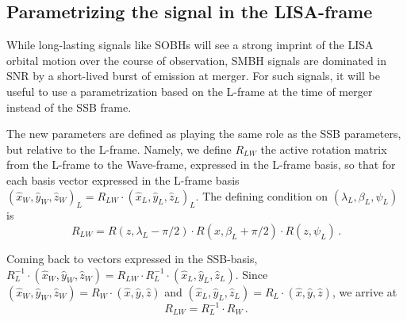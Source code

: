 \documentclass[aps,showpacs,twocolumn,prd,superscriptaddress,nofootinbib]{revtex4-1}
\newcommand{\be}{\begin{equation}}
\newcommand{\ee}{\end{equation}}
\begin{document}
\subsection{Parametrizing the signal in the LISA-frame}
\label{sec:LISAframeparams}

While long-lasting signals like SOBHs will see a strong imprint of the LISA orbital motion over the course of observation, SMBH signals are dominated in SNR by a short-lived burst of emission at merger. For such signals, it will be useful to use a parametrization based on the L-frame at the time of merger instead of the SSB frame.

The new parameters are defined as playing the same role as the SSB parameters, but relative to the L-frame. Namely, we define $R_{LW}$ the active rotation matrix from the L-frame to the Wave-frame, expressed in the L-frame basis, so that for each basis vector expressed in the L-frame basis $(\hat{x}_{W}, \hat{y}_{W}, \hat{z}_{W})_{L} = R_{LW} \cdot (\hat{x}_{L}, \hat{y}_{L}, \hat{z}_{L})_{L}$. The defining condition on $(\lambda_{L}, \beta_{L}, \psi_{L})$ is
\be\label{eq:defRLW}
	R_{LW} = R(z, \lambda_{L} - \pi/2) \cdot R(x, \beta_{L} + \pi/2 ) \cdot R(z, \psi_{L}) \,.
\ee

Coming back to vectors expressed in the SSB-basis, $R_{L}^{-1} \cdot (\hat{x}_{W}, \hat{y}_{W}, \hat{z}_{W}) = R_{LW} \cdot R_{L}^{-1} \cdot (\hat{x}_{L}, \hat{y}_{L}, \hat{z}_{L})$. Since $ (\hat{x}_{W}, \hat{y}_{W}, \hat{z}_{W}) = R_{W} \cdot (\hat{x}, \hat{y}, \hat{z})$ and $ (\hat{x}_{L}, \hat{y}_{L}, \hat{z}_{L}) = R_{L} \cdot (\hat{x}, \hat{y}, \hat{z})$, we arrive at
\be\label{eq:RLW}
	R_{LW} = R_{L}^{-1} \cdot R_{W} \,.
\ee
\end{document}
